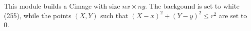This module builds a Cimage with size $nx \times ny$.
The backgound is set to white (255), while 
the points $(X,Y)$ such that $(X-x)^2+(Y-y)^2\leq r^2$ are set to 0.